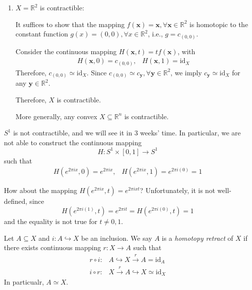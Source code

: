 \begin{example}
\begin{enumerate}
\item
$X=\mathbb{R}^2$ is contractible:

It suffices to show that the mapping $f(\bm x)=\bm x,\forall \bm x\in\mathbb{R}^2$ is homotopic to the constant function $g(x)=(0,0),\forall x\in\mathbb{R}^2$, i.e., $g=c_{(0,0)}$.

Consider the continuous mapping $H(\bm x,t) = tf(\bm x)$, with
\[
\begin{array}{ll}
H(\bm x,0)=c_{(0,0)},
&
H(\bm x,1)=\text{id}_X
\end{array}
\]
Therefore, $c_{(0,0)}\simeq \text{id}_X$.
Since $c_{(0,0)}\simeq c_{\bm y},\forall\bm y\in\mathbb{R}^2$, we imply $c_{\bm y}\simeq\text{id}_X$ for any $\bm y\in \mathbb{R}^2$.

Therefore, $X$ is contractible.

More generally, any convex $X\subseteq\mathbb{R}^n$ is contractible.
\end{enumerate}
\end{example}

\begin{remark}
$S^1$ is not contractible, and we will see it in 3 weeks' time. In particular, we are not able to construct the continuous mapping
\[
H:S^1\times[0,1]\to S^1
\]
such that 
\[
\begin{array}{ll}
H(e^{2\pi ix},0)=e^{2\pi i x},
&
H(e^{2\pi i x},1)=e^{2\pi i(0)} = 1
\end{array}
\]

How about the mapping $H(e^{2\pi ix},t)=e^{2\pi ixt}$?
Unfortunately, it is not well-defined, since
\[
H(e^{2\pi i(1)},t)=e^{2\pi it}=H(e^{2\pi i(0)},t)=1
\]
and the equality is not true for $t\ne0,1$.
\end{remark}


\begin{definition}
Let $A\subseteq X$ and $i:A\hookrightarrow X$ be an inclusion.
We say $A$ is a \emph{homotopy retract} of $X$ if there exists continuous mapping $r:X\to A$ such that 
\begin{align*}
r\circ i:&A\hookrightarrow X\xrightarrow{r}A=\text{id}_{A}\\
i\circ r:&X\xrightarrow{r}A\hookrightarrow X\simeq\text{id}_{X}
\end{align*}
In particualr, $A\simeq X$.
\end{definition}

